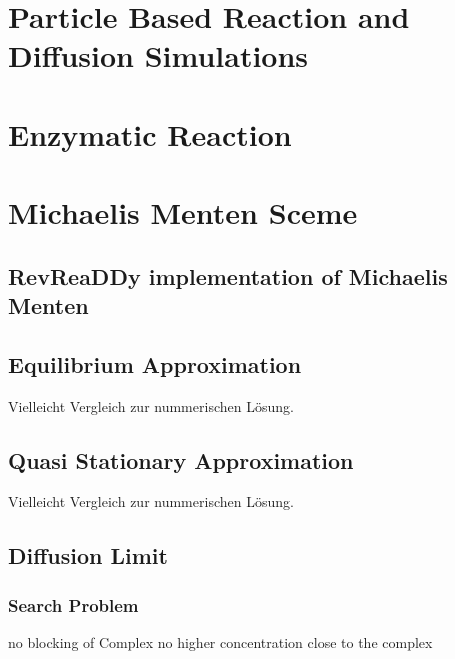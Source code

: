 \documentclass[
  a4paper,BCOR10mm,oneside,
  bibtotoc,idxtotoc,
  headsepline,footsepline,%
  fleqn,openbib
]{scrbook}
\begin{document}
\section{Particle Based Reaction and Diffusion Simulations}
\section{Enzymatic Reaction}
\section{Michaelis Menten Sceme}
\subsection{RevReaDDy implementation of Michaelis Menten}
\subsection{Equilibrium Approximation}
Vielleicht Vergleich zur nummerischen Lösung. 
\subsection{Quasi Stationary Approximation}
Vielleicht Vergleich zur nummerischen Lösung. 
\subsection{Diffusion Limit}

\subsubsection{Search Problem}
no blocking of Complex
no higher concentration close to the complex 
\end{document}
